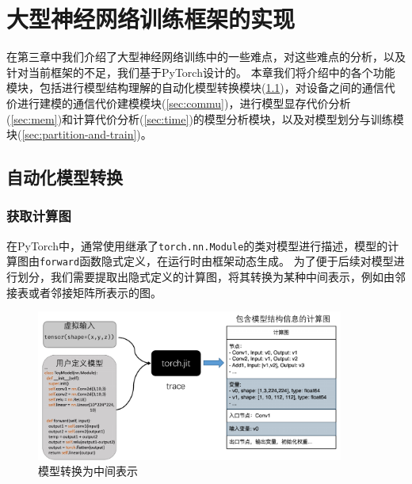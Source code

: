 \chapter{大型神经网络训练框架的实现}
\label{chapter:implementation}


在第三章中我们介绍了大型神经网络训练中的一些难点，对这些难点的分析，以及针对当前框架的不足，我们基于PyTorch设计的\sys{}。
本章我们将介绍\sys{}中的各个功能模块，包括进行模型结构理解的自动化模型转换模块(\ref{sec:convertion})，对设备之间的通信代价进行建模的通信代价建模模块(\ref{sec:commu})，进行模型显存代价分析(\ref{sec:mem})和计算代价分析(\ref{sec:time})的模型分析模块，以及对模型划分与训练模块(\ref{sec:partition-and-train})。

\section{自动化模型转换}
\label{sec:convertion}

\subsection{获取计算图}
在PyTorch中，通常使用继承了\texttt{torch.nn.Module}的类对模型进行描述，模型的计算图由\texttt{forward}函数隐式定义，在运行时由框架动态生成。
为了便于后续对模型进行划分，我们需要提取出隐式定义的计算图，将其转换为某种中间表示，例如由邻接表或者邻接矩阵所表示的图。

\begin{figure}[h]
	\centering
	\includegraphics[width=0.9\textwidth]{figure/3-system/2ir.pdf}
	\caption{模型转换为中间表示}
	\label{fig:2IR}
\end{figure}


